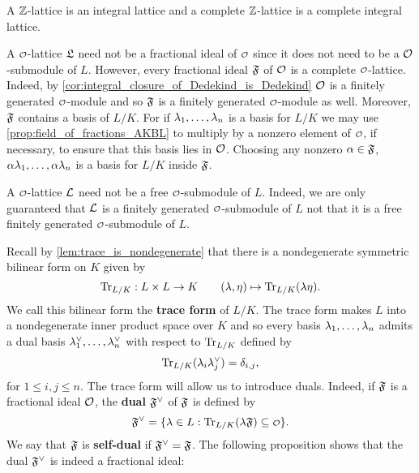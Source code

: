     \begin{remark}
      A $\mathbb{Z}$-lattice is an integral lattice and a complete $\mathbb{Z}$-lattice is a complete integral lattice.
    \end{remark}

    A $\smc{O}$-lattice $\mathfrak{L}$ need not be a fractional ideal of $\smc{O}$ since it does not need to be a $\mathcal{O}$-submodule of $L$. However, every fractional ideal $\mathfrak{F}$ of $\mathcal{O}$ is a complete $\smc{O}$-lattice. Indeed, by \cref{cor:integral_closure_of_Dedekind_is_Dedekind} $\mathcal{O}$ is a finitely generated $\smc{O}$-module and so $\mathfrak{F}$ is a finitely generated $\smc{O}$-module as well. Moreover, $\mathfrak{F}$ contains a basis of $L/K$. For if $\lambda_{1},\ldots,\lambda_{n}$ is a basis for $L/K$ we may use \cref{prop:field_of_fractions_AKBL} to multiply by a nonzero element of $\smc{O}$, if necessary, to ensure that this basis lies in $\mathcal{O}$. Choosing any nonzero $\alpha \in \mathfrak{F}$, $\alpha\lambda_{1},\ldots,\alpha\lambda_{n}$ is a basis for $L/K$ inside $\mathfrak{F}$.

    \begin{remark}
      A $\smc{O}$-lattice $\mathcal{L}$ need not be a free $\smc{O}$-submodule of $L$. Indeed, we are only guaranteed that $\mathcal{L}$ is a finitely generated $\smc{O}$-submodule of $L$ not that it is a free finitely generated $\smc{O}$-submodule of $L$.
    \end{remark}
    
    Recall by \cref{lem:trace_is_nondegenerate} that there is a nondegenerate symmetric bilinear form on $K$ given by
    \[
      \operatorname{\mathrm{Tr}}_{L/K}:L \times L \to K \qquad (\lambda,\eta) \mapsto \operatorname{\mathrm{Tr}}_{L/K}(\lambda\eta).
    \]
    We call this bilinear form the \textbf{trace form} of $L/K$. The trace form makes $L$ into a nondegenerate inner product space over $K$ and so every basis $\lambda_{1},\ldots,\lambda_{n}$ admits a dual basis $\lambda_{1}^{\vee},\ldots,\lambda_{n}^{\vee}$ with respect to $\operatorname{\mathrm{Tr}}_{L/K}$ defined by
    \[
      \operatorname{\mathrm{Tr}}_{L/K}(\lambda_{i}\lambda_{j}^{\vee}) = \delta_{i,j},
    \]
    for $1 \le i,j \le n$. The trace form will allow us to introduce duals. Indeed, if $\mathfrak{F}$ is a fractional ideal $\mathcal{O}$, the \textbf{dual} $\mathfrak{F}^{\vee}$ of $\mathfrak{F}$ is defined by
    \[
      \mf{F}^{\vee} = \{\l \in L:\Trace_{L/K}(\l\mf{F}) \subseteq \smc{O}\}.
    \]
    We say that $\mathfrak{F}$ is \textbf{self-dual} if $\mathfrak{F}^{\vee} = \mathfrak{F}$. The following proposition shows that the dual $\mathfrak{F}^{\vee}$ is indeed a fractional ideal:

